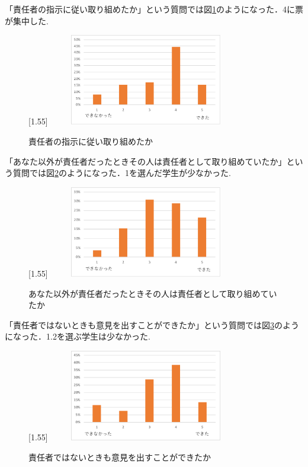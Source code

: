 \documentclass[a4j,11pt]{jsarticle}
\begin{document}
「責任者の指示に従い取り組めたか」という質問では図\ref{anke15}のようになった．4に票が集中した.

\begin{figure}[h]
\begin{center}
\scalebox{1.2}[1.55]{
 \includegraphics[clip,width=85mm,height=40mm]{anke15.pdf}
 }
\end{center}
 \caption{責任者の指示に従い取り組めたか}
 \label{anke15}
\end{figure}


\newpage

「あなた以外が責任者だったときその人は責任者として取り組めていたか」という質問では図\ref{anke16}のようになった．1を選んだ学生が少なかった.

\begin{figure}[h]
\begin{center}
\scalebox{1.2}[1.55]{
 \includegraphics[clip,width=85mm,height=40mm]{anke16.pdf}
 }
\end{center}
 \caption{あなた以外が責任者だったときその人は責任者として取り組めていたか}
 \label{anke16}
\end{figure}

「責任者ではないときも意見を出すことができたか」という質問では図\ref{anke17}のようになった．1.2を選ぶ学生は少なかった.

\begin{figure}[h]
\begin{center}
\scalebox{1.2}[1.55]{
 \includegraphics[clip,width=85mm,height=40mm]{anke17.pdf}
 }
\end{center}
 \caption{責任者ではないときも意見を出すことができたか}
 \label{anke17}
\end{figure}
\end{document}
